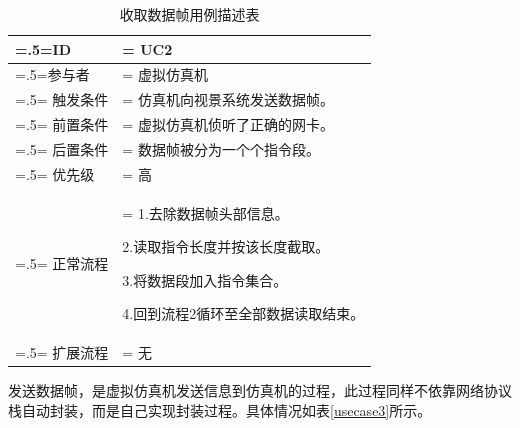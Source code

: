 \begin{table}[htbp]
    \begin{center}
        \caption{收取数据帧用例描述表}
        \label{usecase2}
        \renewcommand\arraystretch{1.5}
        \begin{tabularx}{0.8\textwidth}{ 
            | >{\centering\arraybackslash\hsize=.5\hsize\linewidth=\hsize}X 
            | >{\raggedright\arraybackslash\hsize=1.5\hsize\linewidth=\hsize}X 
            | }
            \hline
            \textbf{ID} & \textbf{UC2}\\
            \hline
            参与者 & 虚拟仿真机\\
            \hline
            触发条件 & 仿真机向视景系统发送数据帧。\\
            \hline
            前置条件 & 虚拟仿真机侦听了正确的网卡。\\
            \hline
            后置条件 & 数据帧被分为一个个指令段。\\
            \hline
            优先级 & 高\\
            \hline
            正常流程 & 1.去除数据帧头部信息。\par 2.读取指令长度并按该长度截取。\par 3.将数据段加入指令集合。\par 4.回到流程2循环至全部数据读取结束。\\
            \hline
            扩展流程 & 无\\
            \hline
        \end{tabularx}
    \end{center}
\end{table}
\par
发送数据帧，是虚拟仿真机发送信息到仿真机的过程，此过程同样不依靠网络协议栈自动封装，而是自己实现封装过程。具体情况如表\ref{usecase3}所示。
